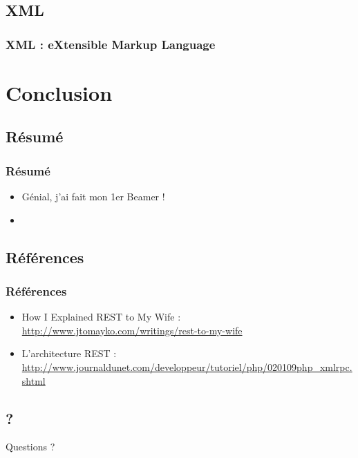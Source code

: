 \documentclass{beamer}
\begin{document}
    \subsection{XML}
        \begin{frame}
            \frametitle{XML : eXtensible Markup Language}
        \end{frame}

\section{Conclusion}

    \subsection{Résumé}
        \begin{frame}
            \frametitle{Résumé}
            \begin{itemize}
                \item Génial, j'ai fait mon 1er Beamer ! 
                \item 
            \end{itemize}
        \end{frame}

    \subsection{Références}
        \begin{frame}
            \frametitle{Références}
            \begin{itemize}
                \item \normalsize How I Explained REST to My Wife :\\
                    \tiny \url{http://www.jtomayko.com/writings/rest-to-my-wife}
                \item \normalsize L'architecture REST :\\
                    \tiny \url{http://www.journaldunet.com/developpeur/tutoriel/php/020109php_xmlrpc.shtml}
            \end{itemize}
        \end{frame}

    \subsection{?}
        \begin{frame}
            \begin{center}
            \Huge{Questions ?}
            \end{center}
        \end{frame}

\end{document}

